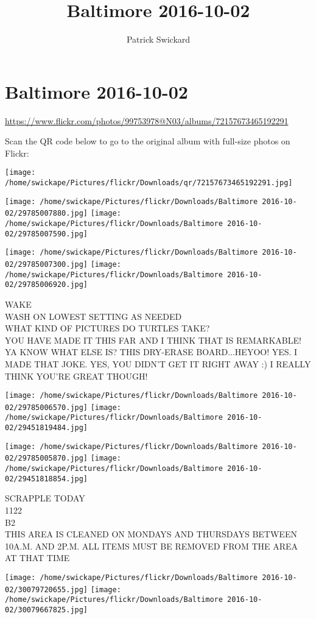 \documentclass[10pt,letterpaper]{article}
\title{Baltimore 2016-10-02}
\author{Patrick Swickard}
\date{}
\begin{document}
\section*{Baltimore 2016-10-02}

\url{https://www.flickr.com/photos/99753978@N03/albums/72157673465192291}

Scan the QR code below to go to the original album with full-size photos on Flickr:

\texttt{[image: /home/swickape/Pictures/flickr/Downloads/qr/72157673465192291.jpg]}
\pagebreak

\texttt{[image: /home/swickape/Pictures/flickr/Downloads/Baltimore 2016-10-02/29785007880.jpg]}
\texttt{[image: /home/swickape/Pictures/flickr/Downloads/Baltimore 2016-10-02/29785007590.jpg]}

\texttt{[image: /home/swickape/Pictures/flickr/Downloads/Baltimore 2016-10-02/29785007300.jpg]}
\texttt{[image: /home/swickape/Pictures/flickr/Downloads/Baltimore 2016-10-02/29785006920.jpg]}

WAKE\\
WASH ON LOWEST SETTING AS NEEDED\\
WHAT KIND OF PICTURES DO TURTLES TAKE?\\
YOU HAVE MADE IT THIS FAR AND I THINK THAT IS REMARKABLE!  YA KNOW WHAT ELSE IS?  THIS DRY{-}ERASE BOARD...HEYOO! YES.  I MADE THAT JOKE.  YES, YOU DIDN'T GET IT RIGHT AWAY :) I REALLY THINK YOU'RE GREAT THOUGH!
\pagebreak

\texttt{[image: /home/swickape/Pictures/flickr/Downloads/Baltimore 2016-10-02/29785006570.jpg]}
\texttt{[image: /home/swickape/Pictures/flickr/Downloads/Baltimore 2016-10-02/29451819484.jpg]}

\texttt{[image: /home/swickape/Pictures/flickr/Downloads/Baltimore 2016-10-02/29785005870.jpg]}
\texttt{[image: /home/swickape/Pictures/flickr/Downloads/Baltimore 2016-10-02/29451818854.jpg]}

SCRAPPLE TODAY\\
1122\\
B2\\
THIS AREA IS CLEANED ON MONDAYS AND THURSDAYS BETWEEN 10A.M. AND 2P.M. ALL ITEMS MUST BE REMOVED FROM THE AREA AT THAT TIME
\pagebreak

\texttt{[image: /home/swickape/Pictures/flickr/Downloads/Baltimore 2016-10-02/30079720655.jpg]}
\texttt{[image: /home/swickape/Pictures/flickr/Downloads/Baltimore 2016-10-02/30079667825.jpg]}
\end{document}
